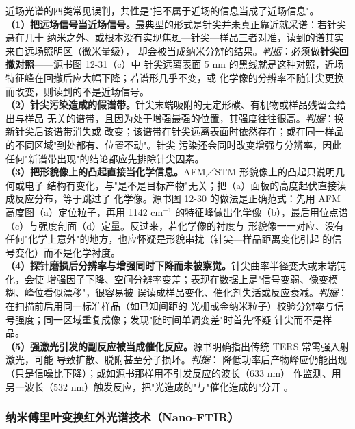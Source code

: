 \begin{pitfall}
近场光谱的四类常见误判，共性是"把不属于近场的信息当成了近场信息"。\\
\textbf{（1）把远场信号当近场信号。}最典型的形式是针尖并未真正靠近就采谱：若针尖悬在几十
纳米之外、或根本没有实现焦斑—针尖—样品三者对准，读到的谱其实来自远场照明区（微米量级），
却会被当成纳米分辨的结果。\emph{判据}：必须做\textbf{针尖回撤对照}——源书图 12-31（c）中
针尖远离表面 5 nm 的黑线就是这种对照，近场特征峰在回撤后应大幅下降；若谱形几乎不变，或
化学像的分辨率不随针尖更换而改变，则读到的不是近场信号。\\
\textbf{（2）针尖污染造成的假谱带。}针尖末端吸附的无定形碳、有机物或样品残留会给出与样品
无关的谱带，且因为处于增强最强的位置，其强度往往很高。\emph{判据}：换新针尖后该谱带消失或
改变；该谱带在针尖远离表面时依然存在；或在同一样品的不同区域"到处都有、位置不动"。针尖
污染还会同时改变增强与分辨率，因此任何"新谱带出现"的结论都应先排除针尖因素。\\
\textbf{（3）把形貌像上的凸起直接当化学信息。}AFM／STM 形貌像上的凸起只说明几何或电子
结构有变化，与"是不是目标产物"无关；把（a）面板的高度起伏直接读成反应分布，等于跳过了
化学像。源书图 12-30 的做法是正确范式：先用 AFM 高度图（a）定位粒子，再用 1142 cm$^{-1}$
的特征峰做出化学像（b），最后用位点谱（c）与强度剖面（d）定量。反过来，若化学像的衬度与
形貌像一一对应、没有任何"化学上意外"的地方，也应怀疑是形貌串扰（针尖—样品距离变化引起
的信号变化）而不是化学衬度。\\
\textbf{（4）探针磨损后分辨率与增强同时下降而未被察觉。}针尖曲率半径变大或末端钝化，会使
增强因子下降、空间分辨率变差；表现在数据上是"信号变弱、像变模糊、峰位看似漂移"，很容易被
误读成样品变化、催化剂失活或反应衰减。\emph{判据}：在扫描前后用同一标准样品（如已知间距的
光栅或金纳米粒子）校验分辨率与信号强度；同一区域重复成像；发现"随时间单调变差"时首先怀疑
针尖而不是样品。\\
\textbf{（5）强激光引发的副反应被当成催化反应。}源书明确指出传统 TERS 常需强入射激光，可能
导致扩散、脱附甚至分子损坏。\emph{判据}：
降低功率后产物峰应仍能出现（只是信噪比下降）；或如源书那样用不引发反应的波长（633 nm）
作监测、用另一波长（532 nm）触发反应，把"光造成的"与"催化造成的"分开
。
\end{pitfall}

\subsubsection{纳米傅里叶变换红外光谱技术（Nano-FTIR）}
\label{ssec:nanoftir}

